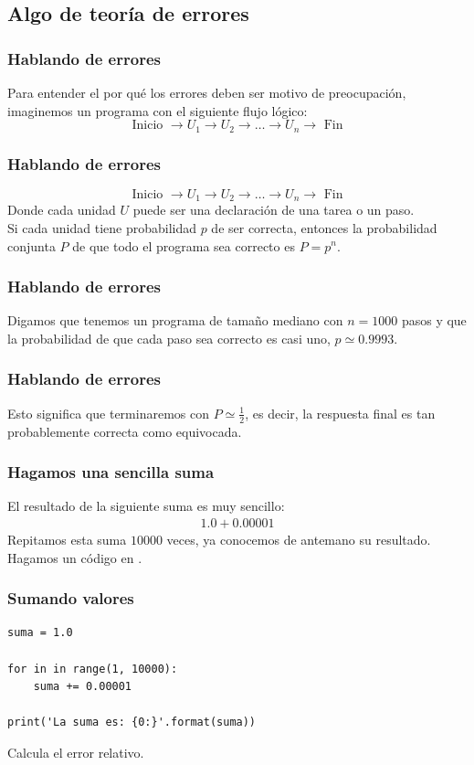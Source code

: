 \documentclass[12pt]{beamer}
\begin{document}
\subsection{Algo de teoría de errores}

\begin{frame}
\frametitle{Hablando de errores}
Para entender el por qué los errores deben ser motivo de preocupación, imaginemos un programa con el siguiente flujo lógico:
\pause
\begin{equation}
\text{Inicio } \rightarrow U_{1} \rightarrow U_{2} \rightarrow \ldots \rightarrow U_{n} \rightarrow \text{ Fin} 
\label{eq:ecuacion_02_01}
\end{equation}
\end{frame}
\begin{frame}
\frametitle{Hablando de errores}
\begin{equation*}
\text{Inicio } \rightarrow U_{1} \rightarrow U_{2} \rightarrow \ldots \rightarrow U_{n} \rightarrow \text{ Fin} 
\end{equation*}
Donde cada unidad $U$ puede ser una declaración de una tarea o un paso.
\\
\bigskip
\pause
Si cada unidad tiene probabilidad $p$ de ser correcta, entonces la probabilidad conjunta $P$ de que todo el programa sea correcto es $P = p^{n}$.
\\
\end{frame}
\begin{frame}
\frametitle{Hablando de errores}
Digamos que tenemos un programa de tamaño mediano con $n = 1000$ pasos y que la probabilidad de que cada paso sea correcto es casi uno, $p \simeq 0.9993$.
\end{frame}
\begin{frame}
\frametitle{Hablando de errores}
Esto significa que terminaremos con $P \simeq \frac{1}{2}$, es decir, la respuesta final es tan probablemente correcta como equivocada.
\end{frame}
\begin{frame}
\frametitle{Hagamos una sencilla suma}
El resultado de la siguiente suma es muy sencillo:
\pause
\begin{align*}
1.0 + 0.00001
\end{align*}
\pause
Repitamos esta suma $10000$ veces, ya conocemos de antemano su resultado. \pause Hagamos un código en \python.
\end{frame}
\begin{frame}[fragile]
\frametitle{Sumando valores}
\begin{lstlisting}[caption=Sumando en un ciclo]
suma = 1.0

for in in range(1, 10000):
    suma += 0.00001

print('La suma es: {0:}'.format(suma))
\end{lstlisting}
Calcula el error relativo.
\end{frame}
\end{document}
